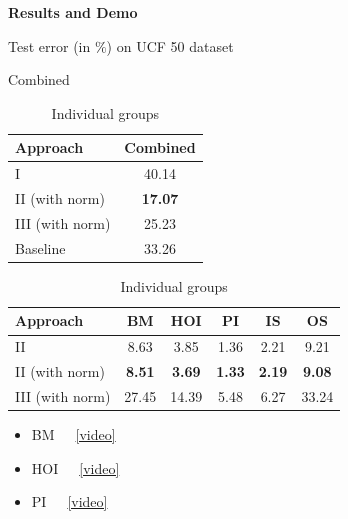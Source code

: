 \begin{frame}{\textbf{Results and Demo}}
	  \begin{scriptsize}
		\begin{table}[htbp]
		\caption{Test error (in $ \% $) on UCF 50 dataset}
			\begin{subtable}[Combined]{0.3\textwidth}
			\centering
			\caption{Combined}
			\begin{tabular}{|l|c|} \hline
				\textbf{Approach}&  \textbf{Combined} \\ \hline
        			I & 40.14\\ \hline
				II (with norm) &  {\color{yellow}\textbf{17.07}} \\ \hline		 
				III (with norm) &  25.23 \\ \hline
				Baseline\footnotemark &  33.26 \\ \hline
   			\end{tabular}
  	 	\end{subtable}
		\begin{subtable}{0.6\textwidth}
			\centering
			\caption{Individual groups}			
			\begin{tabular}{|l|c|c|c|c|c|} \hline
        			\textbf{Approach} & \textbf{BM} & \textbf{HOI} & \textbf{PI} & \textbf{IS} & \textbf{OS} \\ \hline
				II & 8.63 & 3.85 & 1.36 & 2.21 & 9.21 \\ \hline
				II (with norm) & {\color{yellow}\textbf{8.51}} & {\color{yellow}\textbf{3.69}} & {\color{yellow}\textbf{1.33}} & {\color{yellow}\textbf{2.19}} & {\color{yellow}\textbf{9.08}} \\ \hline		 
				III (with norm) & 27.45 & 14.39 & 5.48 & 6.27 & 33.24 \\ \hline
  			 \end{tabular}
	   	\end{subtable}
 		\end{table} 
	\end{scriptsize}
	\begin{center}
		\begin{small}
		\begin{multicols}{3}
		\begin{itemize}
			\item BM~~~\href{run:videos/results/BM.avi}{\color{red}[video]}
			\item HOI~~~\href{run:videos/results/HOI.avi}{\color{red}[video]}
			\item PI~~~\href{run:videos/results/PI.avi}{\color{red}[video]}

\end{itemize}
\end{multicols}
\end{small}
\end{center}
\end{frame}

